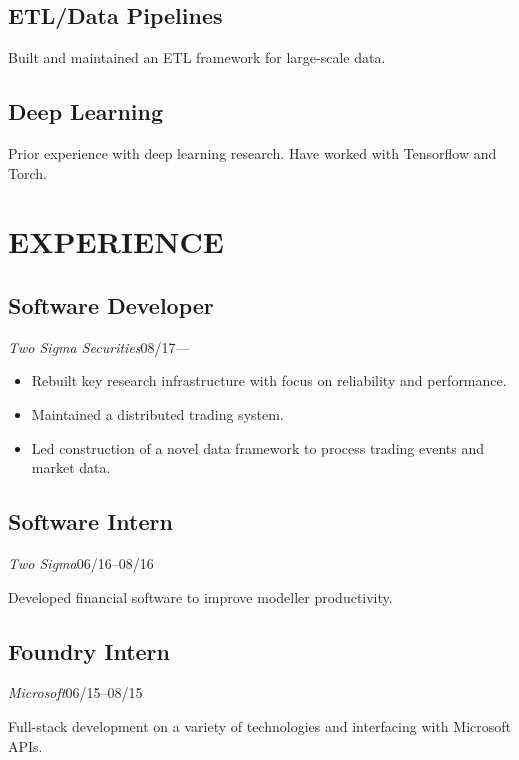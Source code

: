 \documentclass[11pt]{article}
\begin{document}
\begin{minipage}[t]{0.40\textwidth}
  \medskip
  \subsection*{ETL/Data Pipelines}
  Built and maintained an ETL framework for large-scale data.

  \medskip
  \subsection*{Deep Learning}
  Prior experience with deep learning research.
  Have worked with Tensorflow and Torch.


\end{minipage}\hspace{0.04\textwidth}
\begin{minipage}[t]{0.55\textwidth}
  \section*{\LARGE EXPERIENCE}

  \subsection*{Software Developer}
  \emph{Two Sigma Securities}\hfill08/17---
  \smallskip

  \begin{itemize}
    \item Rebuilt key research infrastructure with focus on reliability and performance.
    \item Maintained a distributed trading system.
    \item Led construction of a novel data framework to process trading events and market data.
  \end{itemize}

  \medskip
  \subsection*{Software Intern}
  \emph{Two Sigma}\hfill 06/16--08/16
  \smallskip

  Developed financial software to improve modeller productivity.

  \medskip
  \subsection*{Foundry Intern}
  \emph{Microsoft}\hfill 06/15--08/15
  \smallskip

  Full-stack development on a variety of technologies and interfacing with Microsoft APIs.


\end{minipage}
\end{document}
